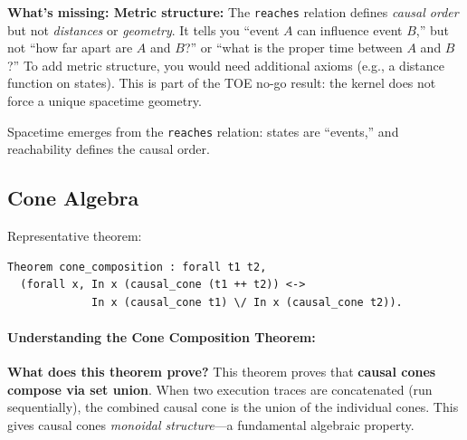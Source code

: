 \textbf{What's missing: Metric structure:} The \texttt{reaches} relation defines \textit{causal order} but not \textit{distances} or \textit{geometry}. It tells you ``event $A$ can influence event $B$,'' but not ``how far apart are $A$ and $B$?'' or ``what is the proper time between $A$ and $B$?'' To add metric structure, you would need additional axioms (e.g., a distance function on states). This is part of the TOE no-go result: the kernel does not force a unique spacetime geometry.


Spacetime emerges from the \texttt{reaches} relation: states are ``events,'' and reachability defines the causal order.

\subsection{Cone Algebra}

Representative theorem:
\begin{lstlisting}
Theorem cone_composition : forall t1 t2,
  (forall x, In x (causal_cone (t1 ++ t2)) <->
             In x (causal_cone t1) \/ In x (causal_cone t2)).
\end{lstlisting}

\paragraph{Understanding the Cone Composition Theorem:}

\textbf{What does this theorem prove?} This theorem proves that \textbf{causal cones compose via set union}. When two execution traces are concatenated (run sequentially), the combined causal cone is the union of the individual cones. This gives causal cones \textit{monoidal structure}---a fundamental algebraic property.

